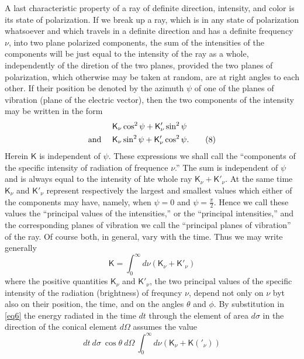 \documentclass[12pt,oneside]{book}
\begin{document}
A last characteristic property of a ray of definite direction, intensity, and color is its state of polarization. If we break up a ray, which is in any state of polarization whatsoever and which travels in a definite direction and has a definite frequency $\nu$, into two plane polarized components, the sum of the intensities of the components will be just equal to the intensity of the ray as a whole, independently of the diretion of the two planes, provided the two planes of polarization, which otherwise may be taken at random, are at right angles to each other. If their position be denoted by the azimuth $\psi$ of one of the planes of vibration (plane of the electric vector), then the two components of the intensity may be written in the form
\begin{align*}
    &\mathsf{K}_\nu \cos^2\psi+\mathsf{K}'_\nu\sin^2\psi \\
    \text{and }\quad &\mathsf{K}_\nu\sin^2\psi+\mathsf{K}'_\nu\cos^2\psi.
    \tag{8}
    \label{eq8}
    \setcounter{equation}{8}
\end{align*}
Herein $\mathsf{K}$ is independent of $\psi$. These expressions we shall call the ``components of the specific intensity of radiation of frequence $\nu$.'' The sum is independent of $\psi$ and is always equal to the intensity of hte whole ray $\mathsf{K}_\nu+\mathsf{K}'_\nu$. At the same time $\mathsf{K}_\nu$ and $\mathsf{K}'_\nu$ represent respectively the largest and smallest values which either of the components may have, namely, when $\psi=0$ and $\psi=\frac{\pi}{2}$. Hence we call these values the ``principal values of the intensities,'' or the ``principal intensities,'' and the corresponding planes of vibration we call the ``principal planes of vibration'' of the ray. Of course both, in general, vary with the time. Thus we may write generally
\begin{equation}
    \mathsf{K}=\int_0^\infty d\nu(\mathsf{K}_\nu+\mathsf{K}'_\nu)
    \label{eq9}
\end{equation}
where the positive quantities $\mathsf{K}_\nu$ and $\mathsf{K}'_\nu$, the two principal values of the specific intensity of the radiation (brightness) of frequncy $\nu$, depend not only on $\nu$ byt also on their position, the time, and on the angles $\theta$ and $\phi$. By substitution in \eqref{eq6} the energy radiated in the time $dt$ through the element of area $d\sigma$ in the direction of the conical element $d\Omega$ assumes the value
\begin{equation}
    dt\ d\sigma\ \cos\theta\ d\Omega\ \int_0^\infty d\nu(\mathsf{K}_\nu+\mathsf{K}('_\nu))
    \label{eq10}
\end{equation}
\end{document}

